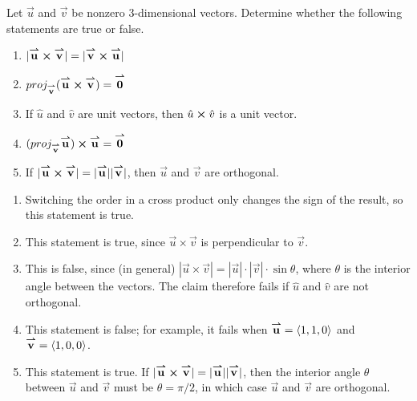 \documentclass[noauthor, handout]{ximera}
\begin{document}
\begin{problem}
Let $\vec{u}$ and $\vec{v}$ be nonzero $3$-dimensional vectors. Determine whether the following statements are true or false. 

\begin{enumerate}[label=(\alph*)]
\item $|\vec{u} \cross \vec{v}| = |\vec{v} \cross \vec{u}|$
\item $proj_{\vec{v}} (\vec{u} \cross \vec{v}) = \vec{0}$
\item If $\hat{u}$ and $\hat{v}$ are unit vectors, then $\hat{u} \cross \hat{v}$ is a unit vector. 
\item $(proj_{\vec{v}} \vec{u}) \cross \vec{u} = \vec{0}$
\item If $|\vec{u} \cross \vec{v}| = |\vec{u}||\vec{v}|$, then $\vec{u}$ and $\vec{v}$ are orthogonal. 
\end{enumerate}


\begin{freeResponse}
\begin{enumerate}[label=(\alph*)]
\item Switching the order in a cross product only changes the sign of the result, so this statement is true.
\item This statement is true, since $\vec{u} \times \vec{v}$ is perpendicular to $\vec{v}$. 
\item This is false, since (in general) $\left|\vec{u} \times \vec{v}\right| = \left|\vec{u}\right| \cdot \left|\vec{v} \right| \cdot \sin \theta$, where $\theta$ is the interior angle between the vectors. The claim therefore fails if $\hat{u}$ and $\hat{v}$ are not orthogonal.
\item This statement is false; for example, it fails when $\vec{u} = \vector{1,1,0}$ and $\vec{v} = \vector{1,0,0}$. 
\item This statement is true. If $|\vec{u} \cross \vec{v}| = |\vec{u}||\vec{v}|$, then the interior angle $\theta$ between $\vec{u}$ and $\vec{v}$ must be $\theta = \pi/2$, in which case $\vec{u}$ and $\vec{v}$ are orthogonal. 
\end{enumerate}
\end{freeResponse}
\end{problem}
\end{document}
